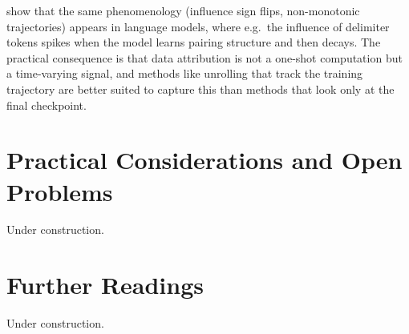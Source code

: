 \documentclass[11pt]{article}
\begin{document}
\begin{remark}\label{rem:developmental}
  \citet{lee2025stagewise} show that the same phenomenology (influence sign flips, non-monotonic trajectories) appears in language models, where e.g.\ the influence of delimiter tokens spikes when the model learns pairing structure and then decays. The practical consequence is that data attribution is not a one-shot computation but a time-varying signal, and methods like unrolling that track the training trajectory are better suited to capture this than methods that look only at the final checkpoint.
\end{remark}


\section{Practical Considerations and Open Problems}\label{sec:practical}

Under construction.




\section{Further Readings}\label{sec:further}

Under construction.



\end{document}
